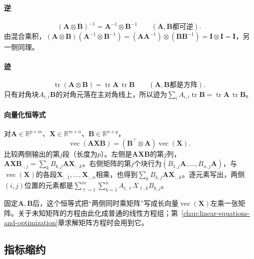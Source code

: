 \paragraph{逆}
\[
 (\bm A\otimes\bm B)^{-1}=\bm A^{-1}\otimes\bm B^{-1}\qquad(\bm A,\bm B\text{都可逆}).
\]
由混合乘积，$(\bm A\otimes\bm B)(\bm A^{-1}\otimes\bm B^{-1})=(\bm A\bm A^{-1})\otimes(\bm B\bm B^{-1})=\bm I\otimes\bm I=\bm I$，另一侧同理。

\paragraph{迹}
\[
 \operatorname{tr}(\bm A\otimes\bm B)=\operatorname{tr}\bm A\,\operatorname{tr}\bm B\qquad(\bm A,\bm B\text{都是方阵}).
\]
只有对角块$A_{i,i}\bm B$的对角元落在主对角线上，所以迹为$\sum_iA_{i,i}\operatorname{tr}\bm B=\operatorname{tr}\bm A\,\operatorname{tr}\bm B$。

\paragraph{向量化恒等式}
对$\bm A\in\mathbb R^{p\times m}$、$\bm X\in\mathbb R^{m\times n}$、$\bm B\in\mathbb R^{n\times q}$，
\begin{equation}
 \operatorname{vec}(\bm A\bm X\bm B)
 =(\bm B^\top\otimes\bm A)\operatorname{vec}(\bm X).
 \label{eq:matrix-analysis-vec-kronecker}
\end{equation}
比较两侧输出的第$j$段（长度为$p$）。左侧是$\bm A\bm X\bm B$的第$j$列，$\bm A\bm X\bm B_{:,j}=\sum_kB_{k,j}\bm A\bm X_{:,k}$。右侧矩阵的第$j$个块行为$(B_{1,j}\bm A,\ldots,B_{n,j}\bm A)$，与$\operatorname{vec}(\bm X)$的各段$\bm X_{:,1},\ldots,\bm X_{:,n}$相乘，也得到$\sum_kB_{k,j}\bm A\bm X_{:,k}$。逐元素写出，两侧$(i,j)$位置的元素都是$\sum_{\ell=1}^m\sum_{k=1}^n A_{i,\ell}X_{\ell,k}B_{k,j}$。

固定$\bm A,\bm B$后，这个恒等式把“两侧同时乘矩阵”写成长向量$\operatorname{vec}(\bm X)$左乘一张矩阵。关于未知矩阵的方程由此化成普通的线性方程组；第~\ref{chap:linear-equations-and-optimization}章求解矩阵方程时会用到它。

\subsection{指标缩约}
\label{sec:ls-tensor-operation-properties}
\label{sec:ls-tensor-contraction}

